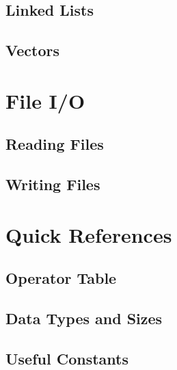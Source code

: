 \documentclass[14pt,table]{extbook}
\begin{document}
	        \section{Linked Lists}
	        \section{Vectors}

		\chapter{File I/O}
			\section{Reading Files}
			\section{Writing Files}

\appendix
	
	
	
	\chapter{Quick References}
		\section{Operator Table}
		\section{Data Types and Sizes}
		\section{Useful Constants}
\end{document}
